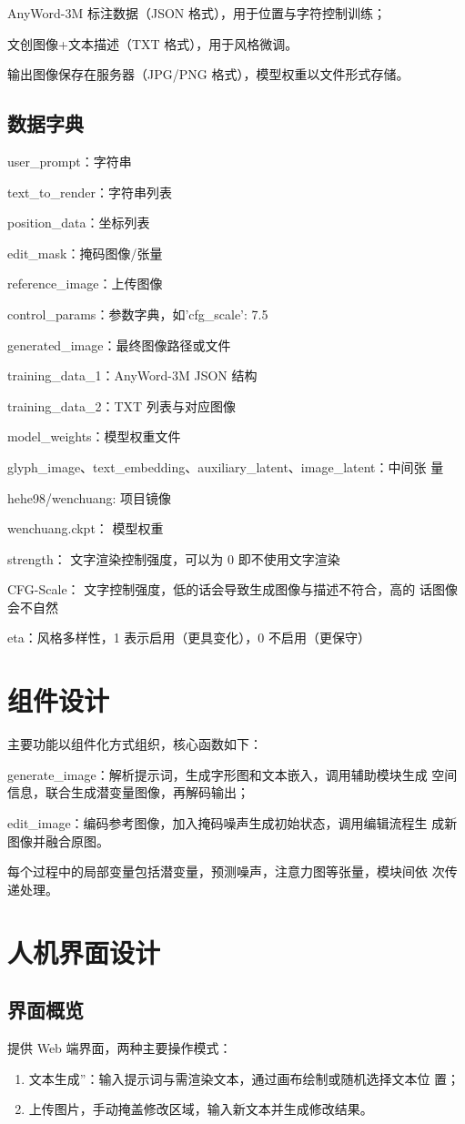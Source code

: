 \documentclass[a4paper,12pt]{article}
\begin{document}
AnyWord-3M 标注数据（JSON 格式），用于位置与字符控制训练；

文创图像+文本描述（TXT 格式），用于风格微调。

输出图像保存在服务器（JPG/PNG 格式），模型权重以文件形式存储。
\subsection{数据字典}
user\_prompt：字符串

text\_to\_render：字符串列表

position\_data：坐标列表

edit\_mask：掩码图像/张量

reference\_image：上传图像

control\_params：参数字典，如{'cfg\_scale': 7.5}

generated\_image：最终图像路径或文件

training\_data\_1：AnyWord-3M JSON 结构

training\_data\_2：TXT 列表与对应图像

model\_weights：模型权重文件

glyph\_image、text\_embedding、auxiliary\_latent、image\_latent：中间张
量

hehe98/wenchuang: 项目镜像

wenchuang.ckpt： 模型权重

strength： 文字渲染控制强度，可以为 0 即不使用文字渲染

CFG-Scale： 文字控制强度，低的话会导致生成图像与描述不符合，高的
话图像会不自然

eta：风格多样性，1 表示启用（更具变化），0 不启用（更保守）

\section{组件设计}
主要功能以组件化方式组织，核心函数如下：

generate\_image：解析提示词，生成字形图和文本嵌入，调用辅助模块生成
空间信息，联合生成潜变量图像，再解码输出；

edit\_image：编码参考图像，加入掩码噪声生成初始状态，调用编辑流程生
成新图像并融合原图。

每个过程中的局部变量包括潜变量，预测噪声，注意力图等张量，模块间依
次传递处理。

\section{人机界面设计}
\subsection{界面概览}
提供 Web 端界面，两种主要操作模式：
\begin{enumerate}
    \item 文本生成”：输入提示词与需渲染文本，通过画布绘制或随机选择文本位
    置；
    \item 上传图片，手动掩盖修改区域，输入新文本并生成修改结果。
\end{enumerate}
\end{document}
